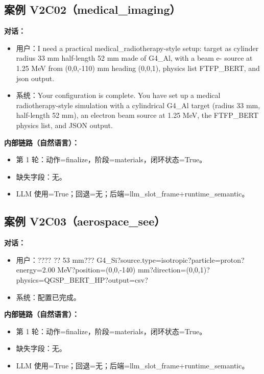 \documentclass[11pt]{ctexart}
\begin{document}
\subsection{案例 V2C02（medical\_imaging）}
\textbf{对话：}
\begin{itemize}
\item 用户：I need a practical medical\_radiotherapy-style setup: target as cylinder radius 33 mm half-length 52 mm made of G4\_Al, with a beam e- source at 1.25 MeV from (0,0,-110) mm heading (0,0,1), physics list FTFP\_BERT, and json output.
\item 系统：Your configuration is complete. You have set up a medical radiotherapy-style simulation with a cylindrical G4\_Al target (radius 33 mm, half-length 52 mm), an electron beam source at 1.25 MeV, the FTFP\_BERT physics list, and JSON output.
\end{itemize}
\textbf{内部链路（自然语言）：}
\begin{itemize}
\item 第 1 轮：动作=finalize，阶段=materials，闭环状态=True。
\item 缺失字段：无。
\item LLM 使用=True；回退=无；后端=llm\_slot\_frame+runtime\_semantic。
\end{itemize}
\subsection{案例 V2C03（aerospace\_see）}
\textbf{对话：}
\begin{itemize}
\item 用户：???? ?? 53 mm??? G4\_Si?source.type=isotropic?particle=proton?energy=2.00 MeV?position=(0,0,-140) mm?direction=(0,0,1)?physics=QGSP\_BERT\_HP?output=csv?
\item 系统：配置已完成。
\end{itemize}
\textbf{内部链路（自然语言）：}
\begin{itemize}
\item 第 1 轮：动作=finalize，阶段=materials，闭环状态=True。
\item 缺失字段：无。
\item LLM 使用=True；回退=无；后端=llm\_slot\_frame+runtime\_semantic。
\end{itemize}
\end{document}
